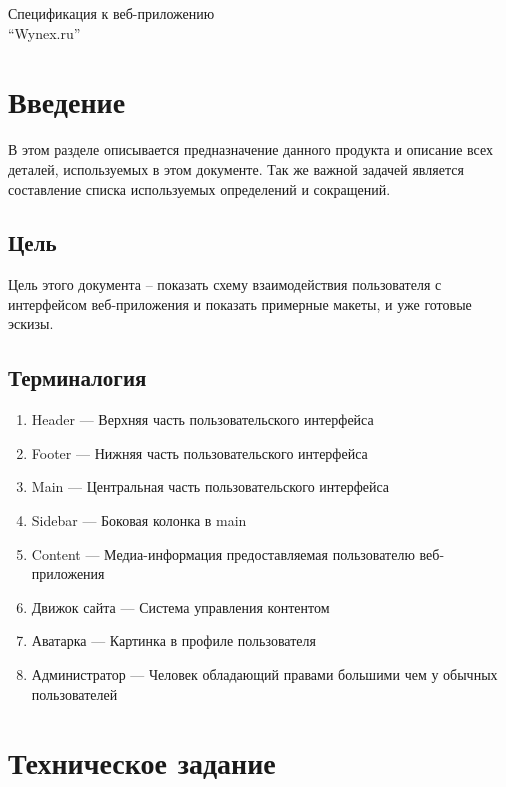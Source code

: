 \documentclass[a4paper]{article}
\begin{document}
\begin{center}
	\hfill \break
	\large{Спецификация к веб-приложению\\ ``Wynex.ru''}\\
\end{center}
\thispagestyle{empty}
\newpage
	\tableofcontents
\newpage
	\section{Введение}
		В этом разделе описывается предназначение данного продукта и описание всех деталей, используемых в этом документе. Так же важной задачей является составление списка используемых определений и сокращений.
	\subsection{Цель}
		Цель этого документа – показать схему взаимодействия пользователя с интерфейсом веб-приложения и показать примерные макеты, и уже готовые эскизы.
	\subsection{Терминалогия}
	\begin{enumerate}
		\item Header --- Верхняя часть пользовательского интерфейса
		\item Footer --- Нижняя часть пользовательского интерфейса
		\item Main --- Центральная часть пользовательского интерфейса
		\item Sidebar --- Боковая колонка в main
		\item Content --- Медиа-информация предоставляемая пользователю веб-приложения
		\item Движок сайта --- Система управления контентом
		\item Аватарка --- Картинка в профиле пользователя
		\item Администратор --- Человек обладающий правами большими чем у обычных пользователей
	\end{enumerate}
\newpage
	\section{Техническое задание}
\end{document}
